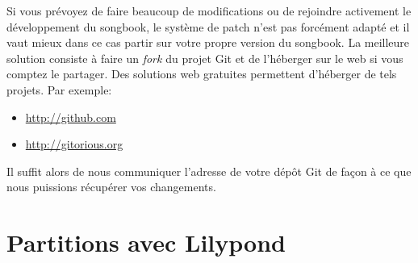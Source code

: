 \documentclass[versionenligne]{patacrep}
\begin{document}
Si vous prévoyez de faire beaucoup de modifications ou de rejoindre
activement le développement du songbook, le système de patch n'est pas
forcément adapté et il vaut mieux dans ce cas partir sur votre propre
version du songbook. La meilleure solution consiste à faire un
\emph{fork} du projet Git et de l'héberger sur le web si vous comptez
le partager. Des solutions web gratuites permettent d'héberger de tels
projets. Par exemple:

\begin{itemize}
\item \url{http://github.com}
\item \url{http://gitorious.org}
\end{itemize}

Il suffit alors de nous communiquer l'adresse de votre dépôt Git de
façon à ce que nous puissions récupérer vos changements.


%
%
%
%
%


\section{Partitions avec Lilypond}
\end{document}
